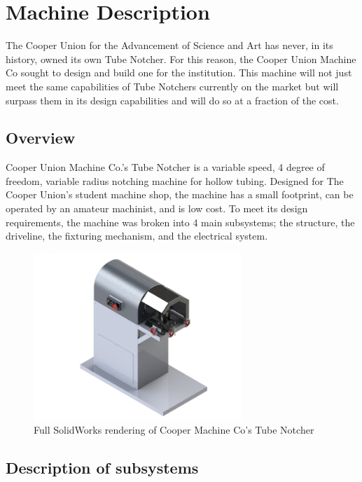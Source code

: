 \chapter{Machine Description}

The Cooper Union for the Advancement of Science and Art has never, in its history, owned its own Tube Notcher. For this reason, the Cooper Union Machine Co sought to design and build one for the institution. This machine will not just meet the same capabilities of Tube Notchers currently on the market but will surpass them in its design capabilities and will do so at a fraction of the cost.

\section{Overview}

Cooper Union Machine Co.'s Tube Notcher is a variable speed, 4 degree of freedom, variable radius notching machine for hollow tubing. Designed for The Cooper Union's student machine shop, the machine has a small footprint, can be operated by an amateur machinist, and is low cost. To meet its design requirements, the machine was broken into 4 main subsystems; the structure, the driveline, the fixturing mechanism, and the electrical system. 

\begin{figure}[H]
    \centering
    \includegraphics[width=0.7\textwidth]{./fall-report pictures/Chapter2-MachineDescription/FullSystemRender}
    \caption{Full SolidWorks rendering of Cooper Machine Co's Tube Notcher}
    \label{fig:FullSystemRender}
\end{figure}


\newpage

\section{Description of subsystems}

